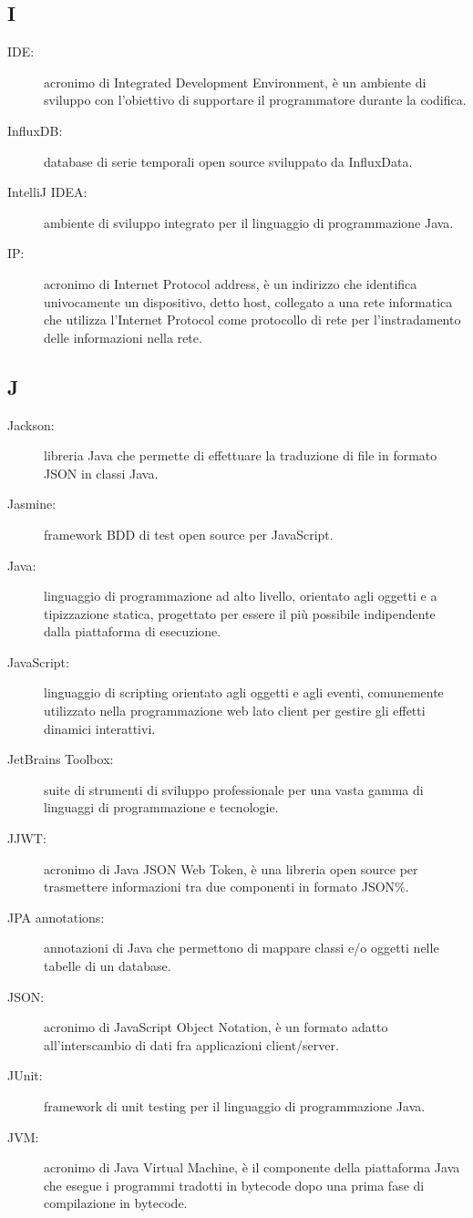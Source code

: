 \documentclass[../manuale-manutentore.tex]{subfiles}
\begin{document}
\subsection{I}

\begin{description}
    \item[IDE:] acronimo di Integrated Development Environment, è un ambiente di sviluppo con l'obiettivo di supportare il programmatore durante la codifica.
    \item[InfluxDB:] database di serie temporali open source sviluppato da InfluxData.
    \item[IntelliJ IDEA:] ambiente di sviluppo integrato per il linguaggio di programmazione Java.
    \item[IP:] acronimo di Internet Protocol address, è un indirizzo che identifica univocamente un dispositivo, detto host, collegato a una rete informatica che utilizza l'Internet Protocol come protocollo di rete per l'instradamento delle informazioni nella rete.
\end{description}

\subsection{J}

\begin{description}
    \item[Jackson:] libreria Java che permette di effettuare la traduzione di file in formato JSON in classi Java.
    \item[Jasmine:] framework BDD di test open source per JavaScript.
    \item[Java:] linguaggio di programmazione ad alto livello, orientato agli oggetti e a tipizzazione statica, progettato per essere il più possibile indipendente dalla piattaforma di esecuzione.
    \item[JavaScript:] linguaggio di scripting orientato agli oggetti e agli eventi, comunemente utilizzato nella programmazione web lato client per gestire gli effetti dinamici interattivi.
    \item[JetBrains Toolbox:] suite di strumenti di sviluppo professionale per una vasta gamma di linguaggi di programmazione e tecnologie.
    \item[JJWT:] acronimo di Java JSON Web Token, è una libreria open source per trasmettere informazioni tra due componenti in formato JSON\%.
    \item[JPA annotations:] annotazioni di Java che permettono di mappare classi e/o oggetti nelle tabelle di un database.
    \item[JSON:] acronimo di JavaScript Object Notation, è un formato adatto all'interscambio di dati fra applicazioni client/server.
    \item[JUnit:] framework di unit testing per il linguaggio di programmazione Java.
    \item[JVM:] acronimo di Java Virtual Machine, è il componente della piattaforma Java che esegue i programmi tradotti in bytecode dopo una prima fase di compilazione in bytecode.
\end{description}
\end{document}
